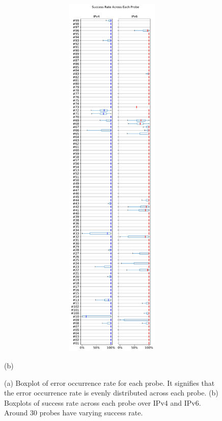 \begin{figure}[!ht]
\begin{minipage}{0.45\textwidth}
		\includegraphics[keepaspectratio, height=18cm, width=15cm]{figures/success/netflix-success-rate-boxplot-each-probe-vert.pdf}
		\caption[Success Rate by Each Probe]{(b)}
	\end{minipage}
	\caption[Error Occurrence and Success Rate by Each Probe]{(a) Boxplot of error occurrence rate for each probe. It signifies that the error occurrence rate is evenly distributed across each probe. (b) Boxplots of success rate across each probe over IPv4 and IPv6. Around 30 probes have varying success rate.}
	\label{fig:Error Occurrence and Success Rate by Each Probe}
\end{figure}

\FloatBarrier

